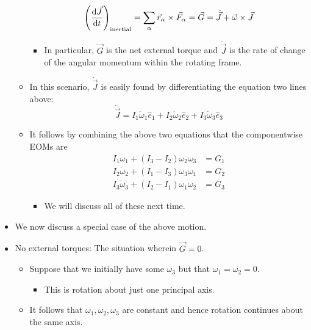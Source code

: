 \documentclass[../notes.tex]{subfiles}
\begin{document}
\begin{itemize}
\begin{itemize}
\begin{equation*}
            \left( \dv{\vec{J}}{t} \right)_\text{inertial} = \sum_\alpha\vec{r}_\alpha\times\vec{F}_\alpha
            = \vec{G}
            = \dot{\vec{J}}+\vec{\omega}\times\vec{J}
        \end{equation*}
        \begin{itemize}
            \item In particular, $\vec{G}$ is the net external torque and $\dot{\vec{J}}$ is the rate of change of the angular momentum within the rotating frame.
        \end{itemize}
        \item In this scenario, $\dot{\vec{J}}$ is easily found by differentiating the equation two lines above:
        \begin{equation*}
            \dot{\vec{J}} = I_1\dot{\omega}_1\hat{e}_1+I_2\dot{\omega}_2\hat{e}_2+I_3\dot{\omega}_3\hat{e}_3
        \end{equation*}
        \item It follows by combining the above two equations that the componentwise EOMs are
        \begin{align*}
            I_1\dot{\omega}_1+(I_3-I_2)\omega_2\omega_3 &= G_1\\
            I_2\dot{\omega}_2+(I_1-I_3)\omega_3\omega_1 &= G_2\\
            I_3\dot{\omega}_3+(I_2-I_1)\omega_1\omega_2 &= G_3
        \end{align*}
        \begin{itemize}
            \item We will discuss all of these next time.
        \end{itemize}
    \end{itemize}
    \item We now discuss a special case of the above motion.
    \item No external torques: The situation wherein $\vec{G}=0$.
    \begin{itemize}
        \item Suppose that we initially have some $\omega_3$ but that $\omega_1=\omega_2=0$.
        \begin{itemize}
            \item This is rotation about just one principal axis.
        \end{itemize}
        \item It follows that $\omega_1,\omega_2,\omega_3$ are constant and hence rotation continues about the same axis.
    \end{itemize}

\end{itemize}
\end{document}
